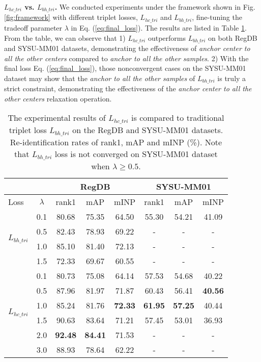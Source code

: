 \documentclass[journal]{IEEEtran}
\begin{document}
\textbf{$L_{hc\_tri}$ vs. $L_{bh\_tri}$.} We conducted experiments under the framework shown in Fig. \ref{fig:framework} with different triplet losses, $L_{hc\_tri}$ and $L_{bh\_tri}$, fine-tuning the tradeoff parameter $\lambda$ in Eq. (\ref{eq:final_loss}). The results are listed in Table \ref{tab:tri}.
From the table, we can observe that 1) $L_{hc\_tri}$ outperforms $L_{bh\_tri}$ on both RegDB and SYSU-MM01 datasets, demonstrating the effectiveness of \emph{anchor center to all the other centers} compared to \emph{anchor to all the other samples}.
2) With the final loss Eq. (\ref{eq:final_loss}), those nonconvergent cases on the SYSU-MM01 dataset may show that the \emph{anchor to all the other samples} of $L_{bh\_tri}$ is truly a strict constraint, demonstrating the effectiveness of the \emph{anchor center to all the other centers} relaxation operation.

\begin{table}
\caption{The experimental results of $L_{hc\_tri}$ is compared to traditional triplet loss $L_{bh\_tri}$ on the RegDB and SYSU-MM01 datasets. Re-identification rates of rank1, mAP and mINP (\%). Note that $L_{bh\_tri}$ loss is not converged on SYSU-MM01 dataset when $\lambda \geq 0.5$.}
\label{tab:tri}
  \centering
\begin{tabular}{l|c|c|c|c|c|c|c}
   \toprule[2pt]
    \multicolumn{2}{c|}{} & \multicolumn{3}{c|}{RegDB} & \multicolumn{3}{c}{SYSU-MM01}\\ \hline
    Loss & $\lambda$ & rank1 & mAP & mINP & rank1 & mAP & mINP \\ \toprule[1pt]
    \multirow{4}{*}{$L_{bh\_tri}$}& 0.1 & 80.68 & 75.35 & 64.50 & 55.30 & 54.21 & 41.09\\
    & 0.5 & 82.43 & 78.93 & 69.22 & - & - & - \\
    & 1.0 & 85.10 & 81.40 & 72.13 & - & - & - \\
    & 1.5 & 72.33 & 69.67 & 60.55 & - & - & -  \\ \hline \hline
    \multirow{6}{*}{$L_{hc\_tri}$}& 0.1 &  80.73 & 75.08 & 64.14 & 57.53 & 54.68 & 40.22 \\
    &0.5 & 87.96 & 81.97 & 71.87 & 60.43 & 56.41 & \textbf{40.56} \\
    &1.0 & 85.24 & 81.76 & \textbf{72.33} &  \textbf{61.95} &\textbf{ 57.25} & 40.44 \\
    &1.5 & 90.63 & 83.64 & 71.21 & 57.45 & 53.01 & 36.93 \\
    &2.0 & \textbf{92.48} & \textbf{84.41} & 71.53 & - & - & - \\
    &3.0 & 88.93 & 78.64 & 62.22 & - & - & - \\ \toprule[2pt]
  \end{tabular}
\end{table}
\end{document}
